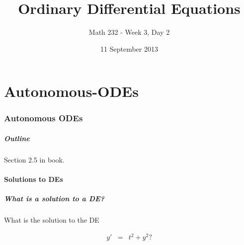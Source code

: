 \part{Autonomous-ODEs}
\section{Autonomous ODEs}

\title{Ordinary Differential Equations}
\subtitle{Math 232 - Week 3, Day 2}
\date{11 September 2013}

\begin{frame}
  \titlepage
\end{frame}

\begin{frame}
  \frametitle{Outline}
  \tableofcontents[hideothersubsections]

  Section 2.5 in book.
\end{frame}


\subsection{Solutions to DEs}


\begin{frame}
  \frametitle{What is a solution to a DE?}

  What is the solution to the DE

  \begin{eqnarray*}
    y' & = & t^2 + y^2?
  \end{eqnarray*}



\end{frame}


